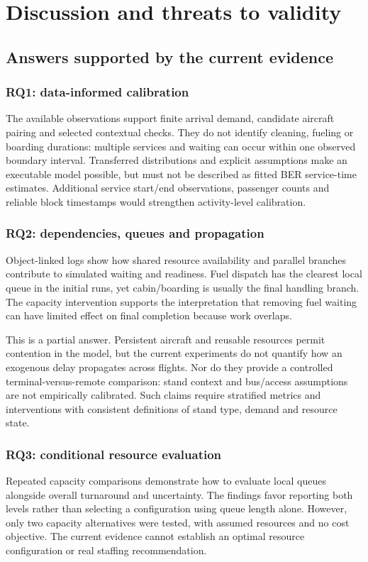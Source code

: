 \chapter{Discussion and threats to validity}
\label{ch:discussion}

\section{Answers supported by the current evidence}
\subsection{RQ1: data-informed calibration}
The available observations support finite arrival demand, candidate aircraft pairing and selected contextual checks. They do not identify cleaning, fueling or boarding durations: multiple services and waiting can occur within one observed boundary interval. Transferred distributions and explicit assumptions make an executable model possible, but must not be described as fitted BER service-time estimates. Additional service start/end observations, passenger counts and reliable block timestamps would strengthen activity-level calibration.

\subsection{RQ2: dependencies, queues and propagation}
Object-linked logs show how shared resource availability and parallel branches contribute to simulated waiting and readiness. Fuel dispatch has the clearest local queue in the initial runs, yet cabin/boarding is usually the final handling branch. The capacity intervention supports the interpretation that removing fuel waiting can have limited effect on final completion because work overlaps.

This is a partial answer. Persistent aircraft and reusable resources permit contention in the model, but the current experiments do not quantify how an exogenous delay propagates across flights. Nor do they provide a controlled terminal-versus-remote comparison: stand context and bus/access assumptions are not empirically calibrated. Such claims require stratified metrics and interventions with consistent definitions of stand type, demand and resource state.

\subsection{RQ3: conditional resource evaluation}
Repeated capacity comparisons demonstrate how to evaluate local queues alongside overall turnaround and uncertainty. The findings favor reporting both levels rather than selecting a configuration using queue length alone. However, only two capacity alternatives were tested, with assumed resources and no cost objective. The current evidence cannot establish an optimal resource configuration or real staffing recommendation.

